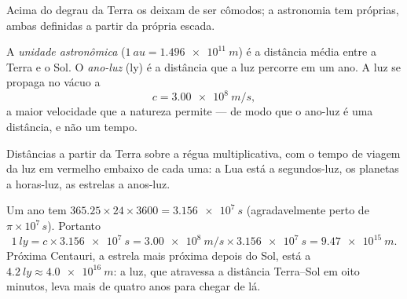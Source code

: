 Acima do degrau da Terra os  deixam de ser cômodos; a astronomia
tem  próprias, ambas definidas a partir da própria escada.

\begin{definition}\label{def:g10:orders-of-magnitude:lightyear}
A \emph{unidade astronômica}
($\qty{1}{au} = \qty{1.496e11}{m}$) é a distância média entre a Terra e o
Sol. O \emph{ano-luz} (\unit{ly}) é a distância que a luz
percorre em um ano. A luz se propaga no vácuo a
\[
c = \qty{3.00e8}{m/s},
\]
a maior velocidade que a natureza permite --- de modo que o ano-luz é
uma distância, e não um tempo.
\end{definition}

\begin{omfigure}

{\small Distâncias a partir da Terra sobre a régua multiplicativa, com o
tempo de viagem da luz em vermelho embaixo de cada uma: a Lua está a
segundos-luz, os planetas a horas-luz, as estrelas a anos-luz.}
\end{omfigure}

\begin{example}\label{ex:g10:orders-of-magnitude:ly}
Um ano tem $365.25 \times 24 \times 3600 = \qty{3.156e7}{s}$
(agradavelmente perto de $\pi \times 10^{7}\,\unit{s}$). Portanto
\[
\qty{1}{ly} = c \times \qty{3.156e7}{s}
= \qty{3.00e8}{m/s} \times \qty{3.156e7}{s}
= \qty{9.47e15}{m}.
\]
Próxima Centauri, a estrela mais próxima depois do Sol, está a
$\qty{4.2}{ly} \approx \qty{4.0e16}{m}$: a luz, que atravessa a
distância Terra--Sol em oito minutos, leva mais de quatro anos para
chegar de lá.
\end{example}

